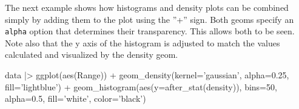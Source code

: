 



The next example shows how histograms and density plots can be combined simply by adding them to the plot using the ''+'' sign. Both geoms specify an \texttt{alpha} option that determines their transparency. This allows both to be seen. Note also that the y axis of the histogram is adjusted to match the values calculated and visualized by the density geom. 

\begin{Rcode}
data |> ggplot(aes(Range)) +
    geom_density(kernel='gaussian', 
        alpha=0.25, fill='lightblue') +
    geom_histogram(aes(y=after_stat(density)), bins=50, 
        alpha=0.5, fill='white', color='black')
\end{Rcode}

